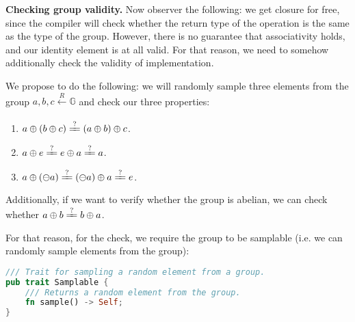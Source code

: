 \documentclass[../lecture-notes-148x210.tex]{subfiles}
\begin{document}
\textbf{Checking group validity.} Now observer the following: we get closure for free, since the compiler will check 
whether the return type of the operation is the same as the type of the group. However, there is no guarantee that 
associativity holds, and our identity element is at all valid. For that reason, we need to somehow additionally check 
the validity of implementation.

We propose to do the following: we will randomly sample three elements from the group 
$a,b,c \xleftarrow[]{R} \mathbb{G}$ and check our three properties:
\begin{enumerate}
    \item $a \oplus (b \oplus c) \xlongequal{?} (a \oplus b) \oplus c$.
    \item $a \oplus e \xlongequal{?} e \oplus a \xlongequal{?} a $.
    \item $a \oplus (\ominus a) \xlongequal{?} (\ominus a) \oplus a \xlongequal{?} e$.
\end{enumerate}

Additionally, if we want to verify whether the group is abelian, we can check whether $a \oplus b \xlongequal{?} b \oplus a$. 

For that reason, for the check, we require the group to be samplable (i.e. we can randomly sample elements from the group):
\begin{lstlisting}[language=Rust]
/// Trait for sampling a random element from a group.
pub trait Samplable {
    /// Returns a random element from the group.
    fn sample() -> Self;
}
\end{lstlisting}
\end{document}
